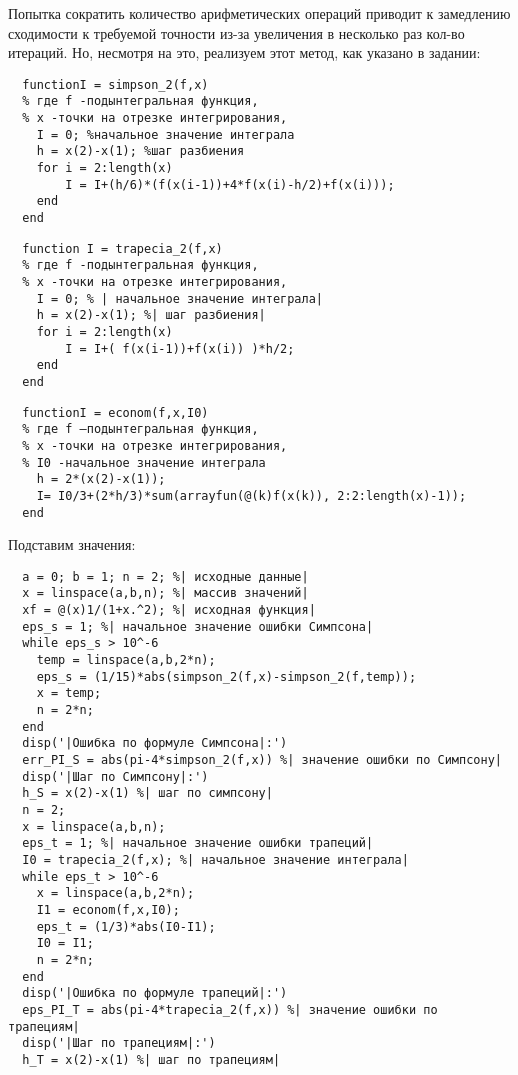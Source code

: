 Попытка сократить количество арифметических операций приводит к замедлению сходимости к требуемой точности из-за увеличения в несколько раз кол-во итераций. Но, несмотря на это, реализуем этот метод, как указано в задании:
\begin{lstlisting}
  functionI = simpson_2(f,x)
  % где f -подынтегральная функция,
  % х -точки на отрезке интегрирования,
    I = 0; %начальное значение интеграла
    h = x(2)-x(1); %шаг разбиения
    for i = 2:length(x)
        I = I+(h/6)*(f(x(i-1))+4*f(x(i)-h/2)+f(x(i)));
    end
  end
\end{lstlisting}
\begin{lstlisting}
  function I = trapecia_2(f,x)
  % где f -подынтегральная функция,
  % х -точки на отрезке интегрирования,
    I = 0; % | начальное значение интеграла|
    h = x(2)-x(1); %| шаг разбиения|
    for i = 2:length(x)
        I = I+( f(x(i-1))+f(x(i)) )*h/2;
    end
  end
\end{lstlisting}
\begin{lstlisting}
  functionI = econom(f,x,I0)
  % где f –подынтегральная функция,
  % х -точки на отрезке интегрирования,
  % I0 -начальное значение интеграла
    h = 2*(x(2)-x(1));
    I= I0/3+(2*h/3)*sum(arrayfun(@(k)f(x(k)), 2:2:length(x)-1));
  end
\end{lstlisting}
Подставим значения:
\begin{lstlisting}
  a = 0; b = 1; n = 2; %| исходные данные|
  x = linspace(a,b,n); %| массив значений|
  хf = @(x)1/(1+x.^2); %| исходная функция|
  eps_s = 1; %| начальное значение ошибки Симпсона|
  while eps_s > 10^-6
    temp = linspace(a,b,2*n);
    eps_s = (1/15)*abs(simpson_2(f,x)-simpson_2(f,temp));
    x = temp;
    n = 2*n;
  end
  disp('|Ошибка по формуле Симпсона|:')
  err_PI_S = abs(pi-4*simpson_2(f,x)) %| значение ошибки по Симпсону|
  disp('|Шаг по Симпсону|:')
  h_S = x(2)-x(1) %| шаг по симпсону|
  n = 2;
  x = linspace(a,b,n);
  eps_t = 1; %| начальное значение ошибки трапеций|
  I0 = trapecia_2(f,x); %| начальное значение интеграла|
  while eps_t > 10^-6
    x = linspace(a,b,2*n);
    I1 = econom(f,x,I0);
    eps_t = (1/3)*abs(I0-I1);
    I0 = I1;
    n = 2*n;
  end
  disp('|Ошибка по формуле трапеций|:')
  eps_PI_T = abs(pi-4*trapecia_2(f,x)) %| значение ошибки по трапециям|
  disp('|Шаг по трапециям|:')
  h_T = x(2)-x(1) %| шаг по трапециям|
  \end{lstlisting}

